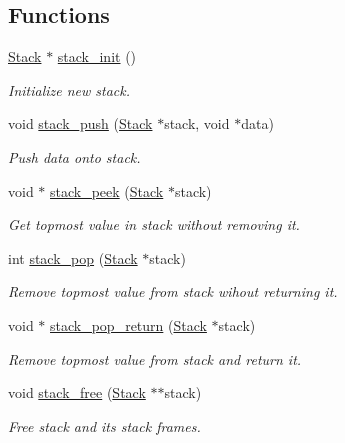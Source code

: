 \subsection*{Functions}
\begin{DoxyCompactItemize}
\item 
\hyperlink{structStack}{Stack} $\ast$ \hyperlink{group__Stack_ga6ed22bc6b5d4779a67eb400d7b6e3dfd}{stack\+\_\+init} ()
\begin{DoxyCompactList}\small\item\em Initialize new stack. \end{DoxyCompactList}\item 
void \hyperlink{group__Stack_ga26f038389f7a063ff212ca6cfee41f2d}{stack\+\_\+push} (\hyperlink{structStack}{Stack} $\ast$stack, void $\ast$data)
\begin{DoxyCompactList}\small\item\em Push data onto stack. \end{DoxyCompactList}\item 
void $\ast$ \hyperlink{group__Stack_ga6c01cb19646f8f9134032e08fd63133a}{stack\+\_\+peek} (\hyperlink{structStack}{Stack} $\ast$stack)
\begin{DoxyCompactList}\small\item\em Get topmost value in stack without removing it. \end{DoxyCompactList}\item 
int \hyperlink{group__Stack_ga86914bce7c52639297c92a086ba87581}{stack\+\_\+pop} (\hyperlink{structStack}{Stack} $\ast$stack)
\begin{DoxyCompactList}\small\item\em Remove topmost value from stack wihout returning it. \end{DoxyCompactList}\item 
void $\ast$ \hyperlink{group__Stack_gad1986611f7a858ac370254eb4a2a1580}{stack\+\_\+pop\+\_\+return} (\hyperlink{structStack}{Stack} $\ast$stack)
\begin{DoxyCompactList}\small\item\em Remove topmost value from stack and return it. \end{DoxyCompactList}\item 
void \hyperlink{group__Stack_ga88c5e1bfd0fccd7738393f47dc946674}{stack\+\_\+free} (\hyperlink{structStack}{Stack} $\ast$$\ast$stack)
\begin{DoxyCompactList}\small\item\em Free stack and its stack frames. \end{DoxyCompactList}\end{DoxyCompactItemize}


